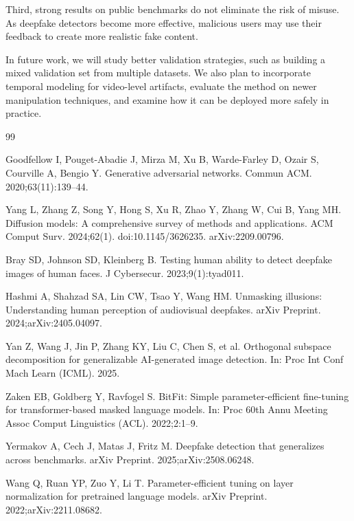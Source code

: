 \documentclass[fonts]{icst}
\begin{document}
Third, strong results on public benchmarks do not eliminate the risk of misuse. As deepfake detectors become more effective, malicious users may use their feedback to create more realistic fake content.

In future work, we will study better validation strategies, such as building a mixed validation set from multiple datasets. We also plan to incorporate temporal modeling for video-level artifacts, evaluate the method on newer manipulation techniques, and examine how it can be deployed more safely in practice.



\begin{thebibliography}{99}
\balance

Goodfellow I, Pouget-Abadie J, Mirza M, Xu B, Warde-Farley D, Ozair S, Courville A, Bengio Y.
Generative adversarial networks.
Commun ACM. 2020;63(11):139–44.

Yang L, Zhang Z, Song Y, Hong S, Xu R, Zhao Y, Zhang W, Cui B, Yang MH.
Diffusion models: A comprehensive survey of methods and applications.
ACM Comput Surv. 2024;62(1). doi:10.1145/3626235. arXiv:2209.00796.

Bray SD, Johnson SD, Kleinberg B.
Testing human ability to detect deepfake images of human faces.
J Cybersecur. 2023;9(1):tyad011.

Hashmi A, Shahzad SA, Lin CW, Tsao Y, Wang HM.
Unmasking illusions: Understanding human perception of audiovisual deepfakes.
arXiv Preprint. 2024;arXiv:2405.04097.

Yan Z, Wang J, Jin P, Zhang KY, Liu C, Chen S, et al.
Orthogonal subspace decomposition for generalizable AI-generated image detection.
In: Proc Int Conf Mach Learn (ICML). 2025.

Zaken EB, Goldberg Y, Ravfogel S.
BitFit: Simple parameter-efficient fine-tuning for transformer-based masked language models.
In: Proc 60th Annu Meeting Assoc Comput Linguistics (ACL). 2022;2:1–9.

Yermakov A, Cech J, Matas J, Fritz M.
Deepfake detection that generalizes across benchmarks.
arXiv Preprint. 2025;arXiv:2508.06248.

Wang Q, Ruan YP, Zuo Y, Li T.
Parameter-efficient tuning on layer normalization for pretrained language models.
arXiv Preprint. 2022;arXiv:2211.08682.


\end{thebibliography}
\end{document}
